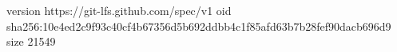 version https://git-lfs.github.com/spec/v1
oid sha256:10e4ed2c9f93c40cf4b67356d5b692ddbb4c1f85afd63b7b28fef90dacb696d9
size 21549
